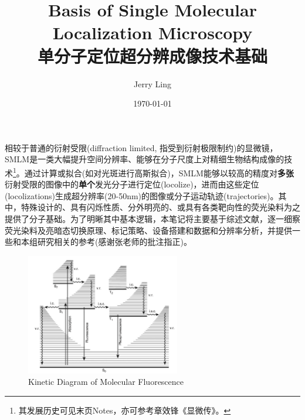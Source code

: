 \documentclass[12pt]{ctexart}
\title{Basis of Single Molecular Localization Microscopy\\单分子定位超分辨成像技术基础}
\author{Jerry Ling}
\date{\today}
\begin{document}
\maketitle  %
相较于普通的衍射受限(diffraction limited, 指受到衍射极限制约)的显微镜，SMLM是一类大幅提升空间分辨率、能够在分子尺度上对精细生物结构成像的技术\footnote{其发展历史可见末页Notes，亦可参考章效锋《显微传》。}。通过计算或拟合(如对光斑进行高斯拟合)，SMLM能够以较高的精度对\textbf{多张}衍射受限的图像中的\textbf{单个}发光分子进行定位(locolize)，进而由这些定位(locolizations)生成超分辨率(20-50nm)的图像或分子运动轨迹(trajectories)。其中，特殊设计的、具有闪烁性质、分外明亮的、或具有各类靶向性的荧光染料为之提供了分子基础。为了明晰其中基本逻辑，本笔记将主要基于综述文献\cite{lelekSinglemoleculeLocalizationMicroscopy2021}，逐一细察荧光染料及亮暗态切换原理、标记策略、设备搭建和数据和分辨率分析，并提供一些和本组研究相关的参考(感谢张老师的批注指正)。

\begin{figure}[t] %
    \centering
    \includegraphics[width=0.6\textwidth]{Kinetic_diagram}
    \caption{Kinetic Diagram of Molecular Fluorescence}
    \label{Kinetic}
\end{figure}
\end{document}
